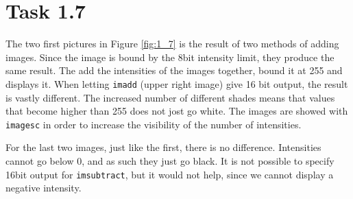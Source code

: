 \section{Task 1.7}

The two first pictures in Figure \ref{fig:1_7} is the result of two methods of
adding images. Since the image is bound by the 8bit intensity limit, they
produce the same result. The add the intensities of the images together, bound
it at 255 and displays it. When letting \texttt{imadd} (upper right image) give
16 bit output, the result is vastly different. The increased number of different
shades means that values that become higher than 255 does not jost go white. The
images are showed with \texttt{imagesc} in order to increase the visibility of
the number of intensities.

For the last two images, just like the first, there is no
difference. Intensities cannot go below 0, and as such they just go black. It is
not possible to specify 16bit output for \texttt{imsubtract}, but it would not
help, since we cannot display a negative intensity.
